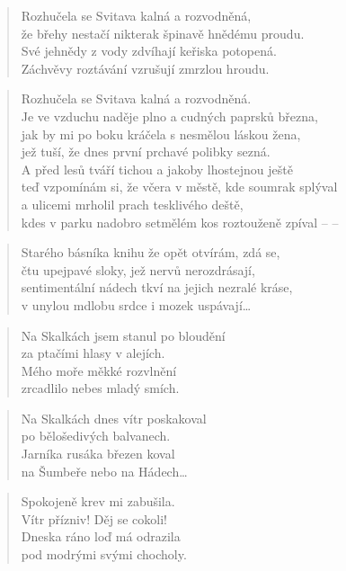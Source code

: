 \documentclass{book}
\begin{document}
\newpage
{}
\begin{verse}
Rozhučela se Svitava kalná a rozvodněná,\\
že břehy nestačí nikterak špinavě hnědému proudu.\\
Své jehnědy z vody zdvíhají keřiska potopená.\\
Záchvěvy roztávání vzrušují zmrzlou hroudu.
\end{verse}
\begin{verse}
Rozhučela se Svitava kalná a rozvodněná.\\
Je ve vzduchu naděje plno a cudných paprsků března,\\
jak by mi po boku kráčela s nesmělou láskou žena,\\
jež tuší, že dnes první prchavé polibky sezná.\\
A před lesů tváří tichou a jakoby lhostejnou ještě\\
teď vzpomínám si, že včera v městě, kde soumrak splýval\\
a ulicemi mrholil prach tesklivého deště,\\
kdes v parku nadobro setmělém kos roztouženě zpíval -- --
\end{verse}
\begin{verse}
Starého básníka knihu že opět otvírám, zdá se,\\
čtu upejpavé sloky, jež nervů nerozdrásají,\\
sentimentální nádech tkví na jejich nezralé kráse,\\
v unylou mdlobu srdce i mozek uspávají\ldots
\end{verse}
\newpage
{}
\begin{verse}
Na Skalkách jsem stanul po bloudění\\
za ptačími hlasy v alejích.\\
Mého moře měkké rozvlnění\\
zrcadlilo nebes mladý smích.
\end{verse}
\begin{verse}
Na Skalkách dnes vítr poskakoval\\
po bělošedivých balvanech.\\
Jarníka rusáka březen koval\\
na Šumbeře nebo na Hádech\ldots
\end{verse}
\begin{verse}
Spokojeně krev mi zabušila.\\
Vítr přízniv! Děj se cokoli!\\
Dneska ráno loď má odrazila\\
pod modrými svými chocholy.
\end{verse}
\end{document}
